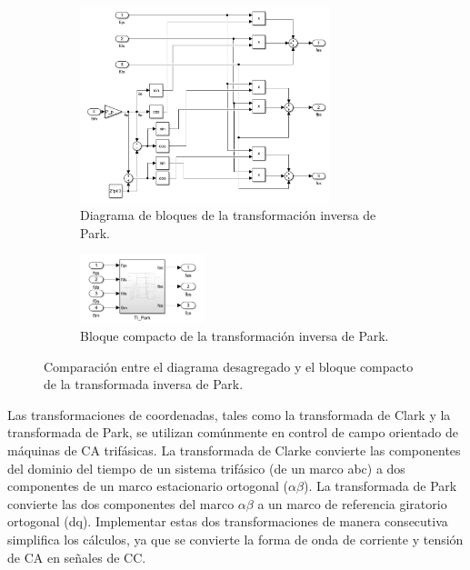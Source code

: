 \documentclass{article}
\begin{document}
\begin{figure}[H]
    \centering
    \begin{subfigure}[t]{\textwidth}
        \centering
        \includegraphics[width=0.80\textwidth]{Imagenes/ParkInversa.png}
        \caption{Diagrama de bloques de la transformación inversa de Park.}
        \label{fig:bloques_park_inversa_desagregado}
    \end{subfigure}
    
    \vspace{0.5cm} %
    
    \begin{subfigure}[t]{\textwidth}
        \centering
        \includegraphics[width=0.4\textwidth]{Imagenes/CompactoParkInversa.png}
        \caption{Bloque compacto de la transformación inversa de Park.}
        \label{fig:bloque_park_inversa_compacto}
    \end{subfigure}
    
    \caption{Comparación entre el diagrama desagregado y el bloque compacto de la transformada inversa de Park.}
    \label{fig:bloques_park_inversa}
\end{figure}


Las transformaciones de coordenadas, tales como la transformada de Clark y la transformada de Park, se utilizan comúnmente en control de campo orientado de máquinas de CA trifásicas. La transformada de Clarke convierte las componentes del dominio del tiempo de un sistema trifásico (de un marco abc) a dos componentes de un marco estacionario ortogonal (\(\alpha \beta\)). La transformada de Park convierte las dos componentes del marco \(\alpha \beta\) a un marco de referencia giratorio ortogonal (dq). Implementar estas dos transformaciones de manera consecutiva simplifica los cálculos, ya que se convierte la forma de onda de corriente y tensión de CA en señales de CC.
\end{document}
